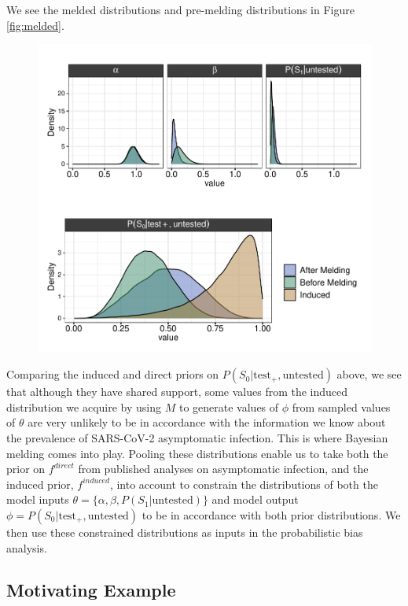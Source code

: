 \documentclass[12pt,twoside]{smiththesis}
\begin{document}
We see the melded distributions and pre-melding distributions in Figure \ref{fig:melded}.
\begin{figure}

{\centering \includegraphics[width=1\linewidth]{thesis_files/figure-latex/unnamed-chunk-20-1} 

}

\caption{\label{fig:melded}}\label{fig:unnamed-chunk-20}
\end{figure}
Comparing the induced and direct priors on \(P(S_0| \text{test}_+, \text{untested})\) above, we see that although they have shared support, some values from the induced distribution we acquire by using \(M\) to generate values of \(\phi\) from sampled values of \(\theta\) are very unlikely to be in accordance with the information we know about the prevalence of SARS-CoV-2 asymptomatic infection. This is where Bayesian melding comes into play. Pooling these distributions enable us to take both the prior on \(f^{direct}\) from published analyses on asymptomatic infection, and the induced prior, \(f^{induced}\), into account to constrain the distributions of both the model inputs \(\theta = \{ \alpha, \beta, P(S_1 | \text{untested})\}\) and model output \(\phi = P(S_0|\text{test}_+, \text{untested})\) to be in accordance with both prior distributions. We then use these constrained distributions as inputs in the probabilistic bias analysis.

\hypertarget{motivating-example}{%
\subsection{Motivating Example}\label{motivating-example}}
\end{document}
